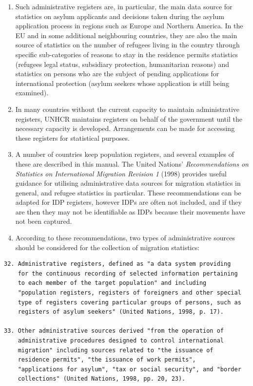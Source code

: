 \documentclass[
]{article}
\begin{document}
\begin{enumerate}
\def\labelenumi{\arabic{enumi}.}
\setcounter{enumi}{149}
\item
  Such administrative registers are, in particular, the main data
  source for statistics on asylum applicants and decisions taken
  during the asylum application process in regions such as Europe and
  Northern America. In the EU and in some additional neighbouring
  countries, they are also the main source of statistics on the number
  of refugees living in the country through specific sub-categories of
  reasons to stay in the residence permits statistics (refugees legal
  status, subsidiary protection, humanitarian reasons) and statistics
  on persons who are the subject of pending applications for
  international protection (asylum seekers whose application is still
  being examined).
\item
  In many countries without the current capacity to maintain
  administrative registers, UNHCR maintains registers on behalf of the
  government until the necessary capacity is developed. Arrangements
  can be made for accessing these registers for statistical purposes.
\item
  A number of countries keep population registers, and several
  examples of these are described in this manual. The United Nations'
  \emph{Recommendations on Statistics on International Migration Revision
  1} (1998) provides useful guidance for utilising administrative data
  sources for migration statistics in general, and refugee statistics
  in particular. These recommendations can be adapted for IDP
  registers, however IDPs are often not included, and if they are then
  they may not be identifiable as IDPs because their movements have
  not been captured.
\item
  According to these recommendations, two types of administrative
  sources should be considered for the collection of migration
  statistics:
\end{enumerate}

\begin{verbatim}
32. Administrative registers, defined as "a data system providing
    for the continuous recording of selected information pertaining
    to each member of the target population" and including
    "population registers, registers of foreigners and other special
    type of registers covering particular groups of persons, such as
    registers of asylum seekers" (United Nations, 1998, p. 17).

33. Other administrative sources derived "from the operation of
    administrative procedures designed to control international
    migration" including sources related to "the issuance of
    residence permits", "the issuance of work permits",
    "applications for asylum", "tax or social security", and "border
    collections" (United Nations, 1998, pp. 20, 23).
\end{verbatim}
\end{document}
